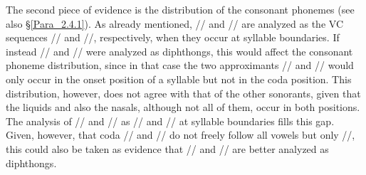 The second piece of evidence is the distribution of the consonant phonemes (see also §\ref{Para_2.4.1}). As already mentioned, // and // are analyzed as the VC sequences // and //, respectively, when they occur at syllable boundaries. If instead // and // were analyzed as diphthongs, this would affect the consonant phoneme distribution, since in that case the two approximants // and // would only occur in the onset position of a syllable but not in the coda position. This distribution, however, does not agree with that of the other sonorants, given that the liquids and also the nasals, although not all of them, occur in both positions. The analysis of // and // as // and // at syllable boundaries fills this gap. Given, however, that coda // and // do not freely follow all vowels but only //, this could also be taken as evidence that // and // are better analyzed as diphthongs.


